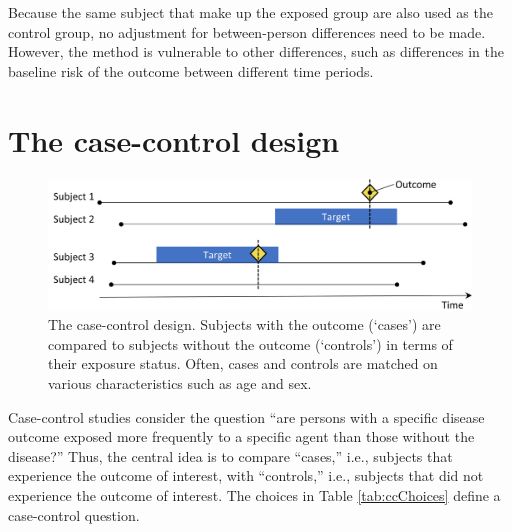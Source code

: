 \documentclass[11pt]{book}
\theoremstyle{definition}
\theoremstyle{definition}
\theoremstyle{definition}
\theoremstyle{remark}
\begin{document}
Because the same subject that make up the exposed group are also used as the control group, no adjustment for between-person differences need to be made. However, the method is vulnerable to other differences, such as differences in the baseline risk of the outcome between different time periods.

\hypertarget{the-case-control-design}{%
\section{The case-control design}\label{the-case-control-design}}


\begin{figure}

{\centering \includegraphics[width=0.9\linewidth]{images/PopulationLevelEstimation/caseControl} 

}

\caption{The case-control design. Subjects with the outcome (‘cases’) are compared to subjects without the outcome (‘controls’) in terms of their exposure status. Often, cases and controls are matched on various characteristics such as age and sex.}\label{fig:caseControl}
\end{figure}

Case-control studies \citep{vandenbroucke_2012} consider the question ``are persons with a specific disease outcome exposed more frequently to a specific agent than those without the disease?'' Thus, the central idea is to compare ``cases,'' i.e., subjects that experience the outcome of interest, with ``controls,'' i.e., subjects that did not experience the outcome of interest. The choices in Table \ref{tab:ccChoices} define a case-control question.   
\end{document}
